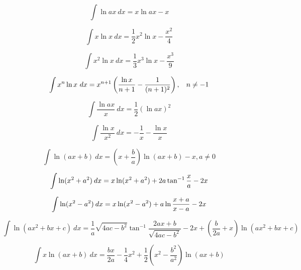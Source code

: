 \documentclass[12pt,letterpaper,leqno]{article}
\begin{document}
\begin{equation}
\int \ln ax\  dx = x \ln ax - x 
\end{equation}

\begin{equation}
\int x \ln x \ dx = \frac{1}{2} x^2 \ln x-\frac{x^2}{4}
\end{equation}

\begin{equation}
\int x^2 \ln x \ dx = \frac{1}{3} x^3 \ln x-\frac{x^3}{9}
\end{equation}

\begin{equation}
\int x^n \ln x\ dx = x^{n+1}\left( \dfrac{\ln x}{n+1}-\dfrac{1}{(n+1)^2}\right),\hspace{2ex} n\neq -1
\end{equation}


\begin{equation}
\int \frac{\ln ax}{x}\ dx = \frac{1}{2}\left ( \ln ax \right)^2 
\end{equation}

\begin{equation}
\int \frac{\ln x}{x^2}\ dx = -\frac{1}{x}-\frac{\ln x}{x}
\end{equation}

\begin{equation}
\int \ln (ax + b) \ dx = \left ( x + \frac{b}{a} \right) \ln (ax+b) - x , a\ne 0
\end{equation}

\begin{equation}
\int \ln  ( x^2 + a^2 )\hspace{.5ex} {dx} = x \ln (x^2 + a^2  ) +2a\tan^{-1} \frac{x}{a} - 2x 
\end{equation}

\begin{equation}
\int \ln  ( x^2 - a^2 )\hspace{.5ex} {dx} = x \ln (x^2 - a^2  ) +a\ln \frac{x+a}{x-a} - 2x 
\end{equation}

\begin{equation}
\int \ln \left ( ax^2 + bx + c\right) \ dx  = \frac{1}{a}\sqrt{4ac-b^2}\tan^{-1}\frac{2ax+b}{\sqrt{4ac-b^2}}
-2x + \left( \frac{b}{2a}+x \right )\ln \left (ax^2+bx+c \right) 
\end{equation}

\begin{equation}
\int x \ln (ax + b)\ dx = \frac{bx}{2a}-\frac{1}{4}x^2 
+\frac{1}{2}\left(x^2-\frac{b^2}{a^2}\right)\ln (ax+b) 
\end{equation}
\end{document}
